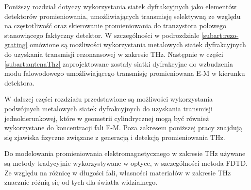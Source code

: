Poniższy rozdział dotyczy wykorzystania siatek dyfrakcyjnych jako elementów detektorów promieniowania, umożliwiających transmisję selektywną ze względu na częstotliwość oraz skierowanie promieniowania do tranzystora polowego stanowiącego faktyczny detektor. W szczególności w podrozdziale \ref{subart:rezo-grating} omówione są możliwości wykorzystania metalowych siatek dyfrakcyjnych do uzyskania transmisji rezonansowej w zakresie THz. Następnie w części \ref{subart:antenaThz} zaprojektowane zostały siatki dyfrakcyjne do wzbudzenia modu falowodowego umożliwiającego transmisję promieniowana E-M w kierunku detektora.

W dalszej części rozdziału przedstawione są możliwości wykorzystania podwójnych metalowych siatek dyfrakcyjnych do uzyskania transmisji jednokierunkowej, które w geometrii cylindrycznej mogą być również wykorzystane do koncentracji fali E-M. Poza zakresem poniższej pracy znajdują się zjawiska fizyczne związane z generacją i detekcją promieniowania THz.

Do modelowania promieniowania elektromagnetycznego w zakresie THz używane są metody tradycyjnie wykorzystywane w optyce, w  szczególności metoda FDTD. Ze względu na różnicę w długości fali, własności materiałów w zakresie THz znacznie różnią się od tych dla światła widzialnego. 
